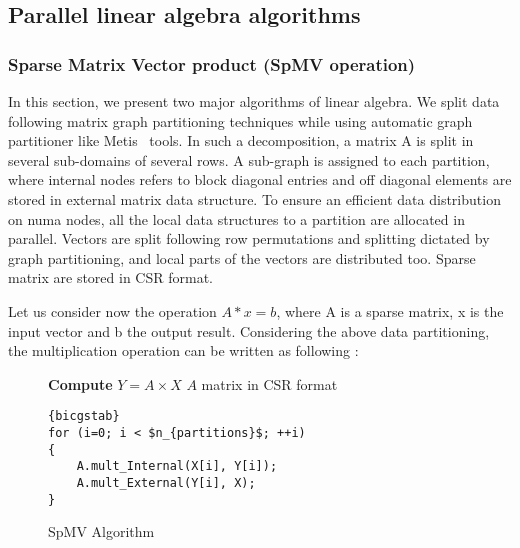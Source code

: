 \documentclass{Styles/llncs}
\begin{document}
\subsection{Parallel linear algebra algorithms}

\subsubsection{Sparse Matrix Vector product (SpMV operation)}

In this section, we present two major algorithms of linear algebra. We split data following matrix graph partitioning techniques \cite{Saad:2003:IMS:829576} while using automatic graph partitioner like Metis~\cite{metis} tools. In such a decomposition, a matrix A is split in several sub-domains of several rows. A sub-graph is assigned to each partition, where internal nodes refers to block diagonal entries and off diagonal elements are stored in external matrix data structure. To ensure an efficient data distribution on numa nodes, all the local data structures to a partition are allocated in parallel. Vectors are split following row permutations and splitting dictated by graph partitioning, and local parts of the vectors are distributed too. Sparse matrix are stored in CSR format.

Let us consider now the operation $A * x = b$, where A is a sparse matrix, x is the input vector and b the output result. Considering the above data partitioning, the multiplication operation can be written as following :

\begin{figure}[t]
\begin{center}
\begin{minipage}[c]{0.6\linewidth}
\small{
\textbf{Compute} $Y =  A\times X$
$A$ matrix in CSR format\\
}
\begin{lstlisting}[frame=none,style=smaller,showlines=true,mathescape=true,firstnumber=1]{bicgstab}
for (i=0; i < $n_{partitions}$; ++i)
{
	A.mult_Internal(X[i], Y[i]); 
	A.mult_External(Y[i], X);
}
\end{lstlisting}
\end{minipage}\hfill
\end{center}
\caption{SpMV Algorithm} \label{lst:spmv}
\end{figure}
\end{document}
